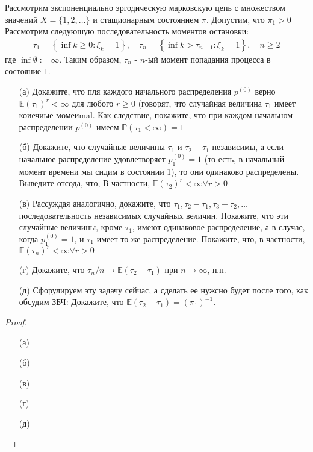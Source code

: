  
    \begin{prob}
        Рассмотрим экспоненциально эргодическую марковскую цепь с множеством значений $X = \{1, 2, \ldots\}$ и стащионарным состоянием $\pi$. Допустим, что $\pi_{1} > 0$ Рассмотрим следуюшую последовательность моментов остановки:
        \begin{gather*}
            \tau_{1} = \left\{\inf k \geqslant 0: \xi_{k}=1\right\},
            \quad
            \tau_{n} = \left\{\inf k>\tau_{n-1}: \xi_{k}=1\right\},
            \quad n \geqslant 2
        \end{gather*}
        где $\inf \emptyset := \infty$. Таким образом, $\tau_{n}$ - $n$-ый момент попадания процесса в состояние $1$.
        \begin{itemize}
        \item[(а)] Докажите, что пля каждого начального распределения $p^{(0)}$ верно $\mathbb{E}\left(\tau_{1}\right)^{r}<\infty$ для любого $r \geq 0$ (говорят, что случайная величина $\tau_{1}$ имеет коиечиые момеиmal. Как следствие, покажите, что при каждом начальном распределении $p^{(0)}$ имеем $\mathbb{P}\left(\tau_{1}<\infty\right)=1$
        \item[(б)] Докажите, что случайные величины $\tau_{1}$ и $\tau_{2}-\tau_{1}$ независимы, а если начальное распределение удовлетворяет $p_{1}^{(0)}=1$ (то есть, в начальный момент времени мы сидим в состоянии 1), то они одинаково распределены. Выведите отсода, что, В частности, $\mathbb{E}\left(\tau_{2}\right)^{r}<\infty \forall r>0$
        \item[(в)] Рассуждая аналогично, докажите, что $\tau_{1}, \tau_{2}-\tau_{1}, \tau_{3}-\tau_{2}, \ldots$ последовательность независимых случайных величин. Покажите, что эти случайные величины, кроме $\tau_{1}$, имеют одинаковое распределение, а в случае, когда $p_{1}^{(0)}=1$, и $\tau_{1}$ имеет то же распределение. Покажите, что, в частности, $\mathbb{E}\left(\tau_{n}\right)^{r}<\infty \forall r>0$
        \item[(г)] Докажите, что $\tau_{n} / n \rightarrow \mathbb{E}\left(\tau_{2}-\tau_{1}\right)$ при $n \rightarrow \infty$, п.н.
        \item[(д)] Сфорулируем эту задачу сейчас, а сделать ее нужсно будет после того, как обсудим ЗБЧ: Докажите, что $\mathbb{E} \left(\tau_{2} - \tau_{1}\right) = \left(\pi_{1}\right)^{-1}$.
        \end{itemize}
    \end{prob}
    \begin{proof}
        \begin{itemize}
        \item[(а)] 
        \item[(б)] 
        \item[(в)] 
        \item[(г)] 
        \item[(д)] 
        \end{itemize}
    \end{proof}